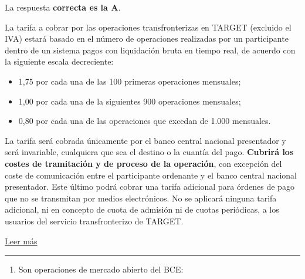 \documentclass[
  letterpaper,
  DIV=11,
  numbers=noendperiod]{scrreprt}
\providecommand{\tightlist}{%
  \setlength{\itemsep}{0pt}\setlength{\parskip}{0pt}}\usepackage{longtable,booktabs,array}
\begin{document}
\begin{tcolorbox}[enhanced jigsaw, left=2mm, opacityback=0, colback=white, breakable, arc=.35mm, bottomrule=.15mm, rightrule=.15mm, toprule=.15mm, leftrule=.75mm, colframe=quarto-callout-tip-color-frame]
\begin{minipage}[t]{5.5mm}
\textcolor{quarto-callout-tip-color}{\faLightbulb}
\end{minipage}%
\begin{minipage}[t]{\textwidth - 5.5mm}

La respuesta \textbf{correcta es la A}.

La tarifa a cobrar por las operaciones transfronterizas en TARGET
(excluido el IVA) estará basado en el número de operaciones realizadas
por un participante dentro de un sistema pagos con liquidación bruta en
tiempo real, de acuerdo con la siguiente escala decreciente:

\begin{itemize}
\item
  1,75 por cada una de las 100 primeras operaciones mensuales;
\item
  1,00 por cada una de la siguientes 900 operaciones mensuales;
\item
  0,80 por cada una de las operaciones que excedan de 1.000 mensuales.
\end{itemize}

La tarifa será cobrada únicamente por el banco central nacional
presentador y será invariable, cualquiera que sea el destino o la
cuantía del pago. \textbf{Cubrirá los costes de tramitación y de proceso
de la operación}, con excepción del coste de comunicación entre el
participante ordenante y el banco central nacional presentador. Este
último podrá cobrar una tarifa adicional para órdenes de pago que no se
transmitan por medios electrónicos. No se aplicará ninguna tarifa
adicional, ni en concepto de cuota de admisión ni de cuotas periódicas,
a los usuarios del servicio transfronterizo de TARGET.

\href{https://www.ecb.europa.eu/pub/pdf/other/tagies.pdf?3e607901e1b83c5448ae746afb0bd782}{Leer
más}

\end{minipage}%
\end{tcolorbox}

\begin{center}\rule{0.5\linewidth}{0.5pt}\end{center}

\begin{enumerate}
\def\labelenumi{\arabic{enumi}.}
\setcounter{enumi}{8}
\tightlist
\item
  Son operaciones de mercado abierto del BCE:
\end{enumerate}
\end{document}

